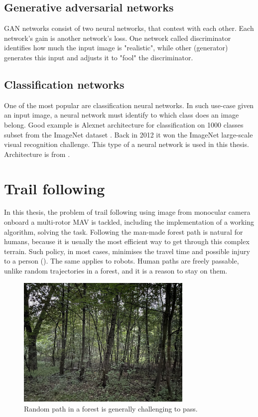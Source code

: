 \subsection{Generative adversarial networks}

GAN networks consist of two neural networks, that contest with each other. Each network's gain is another network's loss. One network called discriminator identifies how much the input image is "realistic", while other (generator) generates this input and adjusts it to "fool" the discriminator.

\subsection{Classification networks}

One of the most popular are classification neural networks. In such use-case given an input image, a neural network must identify to which class does an image belong. Good example is Alexnet architecture for classification on 1000 classes subset from the ImageNet dataset \cite{krizhevsky2012imagenet}. Back in 2012 it won the ImageNet large-scale visual recognition challenge. This type of a neural network is used in this thesis. Architecture is from \cite{giusti2016machine}.

\section{Trail following}

In this thesis, the problem of trail following using image from monocular camera onboard a multi-rotor \acs{MAV} is tackled, including the implementation of a working algorithm, solving the task. Following the man-made forest path is natural for humans, because it is usually the most efficient way to get through this complex terrain. Such policy, in most cases, minimises the travel time and possible injury to a person (). The same applies to robots. Human paths are freely passable, unlike random trajectories in a forest, and it is a reason to stay on them.

\begin{figure}[!h]
  \centering
  \includegraphics[width=0.75\textwidth]{./fig/photos/challenging_path.jpg}

  \caption{Random path in a forest is generally challenging to pass.}
  \label{fig:challenging_path}
\end{figure}

